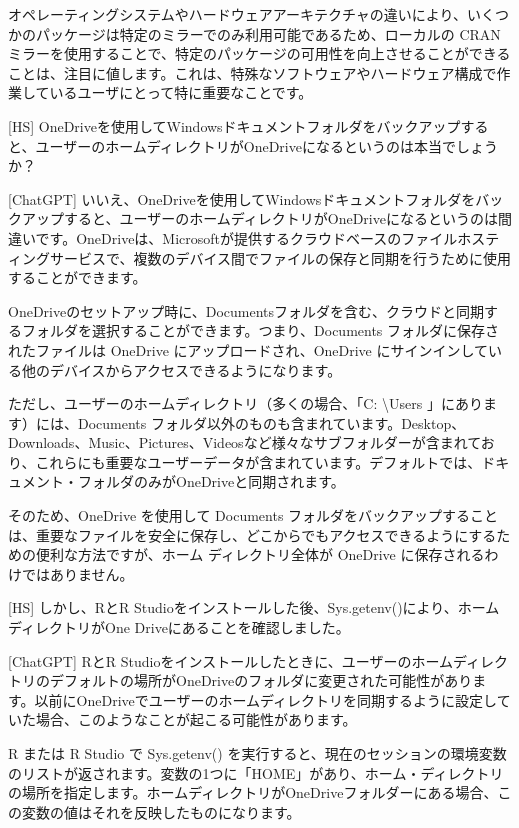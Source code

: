 \documentclass[
]{book}
\theoremstyle{definition}
\theoremstyle{definition}
\theoremstyle{definition}
\theoremstyle{definition}
\theoremstyle{remark}
\begin{document}
オペレーティングシステムやハードウェアアーキテクチャの違いにより、いくつかのパッケージは特定のミラーでのみ利用可能であるため、ローカルの CRAN ミラーを使用することで、特定のパッケージの可用性を向上させることができることは、注目に値します。これは、特殊なソフトウェアやハードウェア構成で作業しているユーザにとって特に重要なことです。

{[}HS{]} OneDriveを使用してWindowsドキュメントフォルダをバックアップすると、ユーザーのホームディレクトリがOneDriveになるというのは本当でしょうか？

{[}ChatGPT{]} いいえ、OneDriveを使用してWindowsドキュメントフォルダをバックアップすると、ユーザーのホームディレクトリがOneDriveになるというのは間違いです。OneDriveは、Microsoftが提供するクラウドベースのファイルホスティングサービスで、複数のデバイス間でファイルの保存と同期を行うために使用することができます。

OneDriveのセットアップ時に、Documentsフォルダを含む、クラウドと同期するフォルダを選択することができます。つまり、Documents フォルダに保存されたファイルは OneDrive にアップロードされ、OneDrive にサインインしている他のデバイスからアクセスできるようになります。

ただし、ユーザーのホームディレクトリ（多くの場合、「C: \textbackslash Users 」にあります）には、Documents フォルダ以外のものも含まれています。Desktop、Downloads、Music、Pictures、Videosなど様々なサブフォルダーが含まれており、これらにも重要なユーザーデータが含まれています。デフォルトでは、ドキュメント・フォルダのみがOneDriveと同期されます。

そのため、OneDrive を使用して Documents フォルダをバックアップすることは、重要なファイルを安全に保存し、どこからでもアクセスできるようにするための便利な方法ですが、ホーム ディレクトリ全体が OneDrive に保存されるわけではありません。

{[}HS{]} しかし、RとR Studioをインストールした後、Sys.getenv()により、ホームディレクトリがOne Driveにあることを確認しました。

{[}ChatGPT{]} RとR Studioをインストールしたときに、ユーザーのホームディレクトリのデフォルトの場所がOneDriveのフォルダに変更された可能性があります。以前にOneDriveでユーザーのホームディレクトリを同期するように設定していた場合、このようなことが起こる可能性があります。

R または R Studio で Sys.getenv() を実行すると、現在のセッションの環境変数のリストが返されます。変数の1つに「HOME」があり、ホーム・ディレクトリの場所を指定します。ホームディレクトリがOneDriveフォルダーにある場合、この変数の値はそれを反映したものになります。
\end{document}
